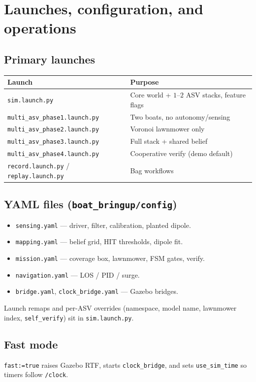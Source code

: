 \chapter{Launches, configuration, and operations}
\label{ch:ops}

\section{Primary launches}
\begin{center}
\begin{tabular}{@{}lp{8.8cm}@{}}
\toprule
Launch & Purpose \\
\midrule
\texttt{sim.launch.py} & Core world + \(1\)--\(2\) ASV stacks, feature flags \\
\texttt{multi\_asv\_phase1.launch.py} & Two boats, no autonomy/sensing \\
\texttt{multi\_asv\_phase2.launch.py} & Voronoi lawnmower only \\
\texttt{multi\_asv\_phase3.launch.py} & Full stack + shared belief \\
\texttt{multi\_asv\_phase4.launch.py} & Cooperative verify (demo default) \\
\texttt{record.launch.py} / \texttt{replay.launch.py} & Bag workflows \\
\bottomrule
\end{tabular}
\end{center}

\section{YAML files (\texttt{boat\_bringup/config})}
\begin{itemize}[leftmargin=*]
  \item \texttt{sensing.yaml} --- driver, filter, calibration, planted dipole.
  \item \texttt{mapping.yaml} --- belief grid, HIT thresholds, dipole fit.
  \item \texttt{mission.yaml} --- coverage box, lawnmower, FSM gates, verify.
  \item \texttt{navigation.yaml} --- LOS / PID / surge.
  \item \texttt{bridge.yaml}, \texttt{clock\_bridge.yaml} --- Gazebo bridges.
\end{itemize}
Launch remaps and per-ASV overrides (namespace, model name, lawnmower index,
\texttt{self\_verify}) sit in \texttt{sim.launch.py}.

\section{Fast mode}
\texttt{fast:=true} raises Gazebo RTF, starts \texttt{clock\_bridge}, and sets
\texttt{use\_sim\_time} so timers follow \texttt{/clock}.

